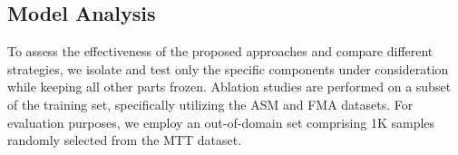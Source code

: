 \subsection{Model Analysis}

To assess the effectiveness of the proposed approaches and compare different strategies, we isolate and test only the specific components under consideration while keeping all other parts frozen. Ablation studies are performed on a subset of the training set, specifically utilizing the ASM and FMA datasets. For evaluation purposes, we employ an out-of-domain set comprising 1K samples randomly selected from the MTT dataset.

\begin{table}[t]
	\begin{center}
	\end{center}
 {\caption{\textbf{Effect of rectified flow training in text-to-music generation.}  We train small version of FluxMusic with different sampling schedule and results show the superiority of RF training with comparable computation burden. }
				\label{tab:loss}}
\end{table} 

